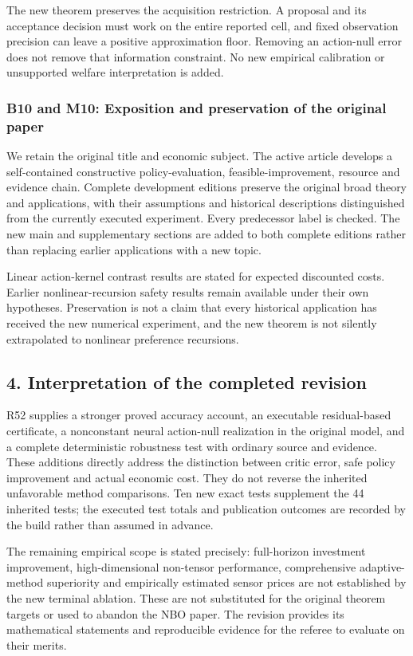 The new theorem preserves the acquisition restriction. A proposal and
its acceptance decision must work on the entire reported cell, and fixed
observation precision can leave a positive approximation floor. Removing
an action-null error does not remove that information constraint. No new
empirical calibration or unsupported welfare interpretation is added.

\hypertarget{b10-and-m10-exposition-and-preservation-of-the-original-paper}{%
\subsubsection{B10 and M10: Exposition and preservation of the original
paper}\label{b10-and-m10-exposition-and-preservation-of-the-original-paper}}

We retain the original title and economic subject. The active article
develops a self-contained constructive policy-evaluation,
feasible-improvement, resource and evidence chain. Complete development
editions preserve the original broad theory and applications, with their
assumptions and historical descriptions distinguished from the currently
executed experiment. Every predecessor label is checked. The new main
and supplementary sections are added to both complete editions rather
than replacing earlier applications with a new topic.

Linear action-kernel contrast results are stated for expected discounted
costs. Earlier nonlinear-recursion safety results remain available under
their own hypotheses. Preservation is not a claim that every historical
application has received the new numerical experiment, and the new
theorem is not silently extrapolated to nonlinear preference recursions.

\hypertarget{interpretation-of-the-completed-revision}{%
\subsection{4. Interpretation of the completed
revision}\label{interpretation-of-the-completed-revision}}

R52 supplies a stronger proved accuracy account, an executable
residual-based certificate, a nonconstant neural action-null realization
in the original model, and a complete deterministic robustness test with
ordinary source and evidence. These additions directly address the
distinction between critic error, safe policy improvement and actual
economic cost. They do not reverse the inherited unfavorable method
comparisons. Ten new exact tests supplement the 44 inherited tests; the
executed test totals and publication outcomes are recorded by the build
rather than assumed in advance.

The remaining empirical scope is stated precisely: full-horizon
investment improvement, high-dimensional non-tensor performance,
comprehensive adaptive-method superiority and empirically estimated
sensor prices are not established by the new terminal ablation. These
are not substituted for the original theorem targets or used to abandon
the NBO paper. The revision provides its mathematical statements and
reproducible evidence for the referee to evaluate on their merits.
